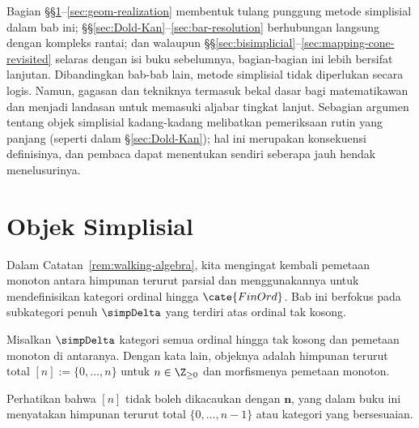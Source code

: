 \begin{wenxintishi}
	Bagian \S\S\ref{sec:simplicial-method}--\ref{sec:geom-realization}
	membentuk tulang punggung metode simplisial dalam bab ini;
	\S\S\ref{sec:Dold-Kan}--\ref{sec:bar-resolution} berhubungan langsung
	dengan kompleks rantai; dan walaupun
	\S\S\ref{sec:bisimplicial}--\ref{sec:mapping-cone-revisited} selaras dengan
	isi buku sebelumnya, bagian-bagian ini lebih bersifat lanjutan. Dibandingkan
	bab-bab lain, metode simplisial tidak diperlukan secara logis. Namun,
	gagasan dan tekniknya termasuk bekal dasar bagi matematikawan dan menjadi
	landasan untuk memasuki aljabar tingkat lanjut. Sebagian argumen tentang
	objek simplisial kadang-kadang melibatkan pemeriksaan rutin yang panjang
	(seperti dalam \S\ref{sec:Dold-Kan}); hal ini merupakan konsekuensi
	definisinya, dan pembaca dapat menentukan sendiri seberapa jauh hendak
	menelusurinya.
\end{wenxintishi}

\section{Objek Simplisial}\label{sec:simplicial-method}
Dalam Catatan~\ref{rem:walking-algebra}, kita mengingat kembali pemetaan
monoton antara himpunan terurut parsial dan menggunakannya untuk mendefinisikan
kategori ordinal hingga $\cate{FinOrd}$. Bab ini berfokus pada subkategori
penuh $\simpDelta$ yang terdiri atas ordinal tak kosong.

\begin{definition}
	\index[sym1]{[n]}
	Misalkan $\simpDelta$ kategori semua ordinal hingga tak kosong dan
	pemetaan monoton di antaranya. Dengan kata lain, objeknya adalah himpunan
	terurut total $[n]:=\{0,\ldots,n\}$ untuk $n\in\Z_{\geq0}$ dan
	morfismenya pemetaan monoton.
\end{definition}

Perhatikan bahwa $[n]$ tidak boleh dikacaukan dengan $\mathbf{n}$, yang dalam
buku ini menyatakan himpunan terurut total $\{0,\ldots,n-1\}$ atau kategori
yang bersesuaian.

